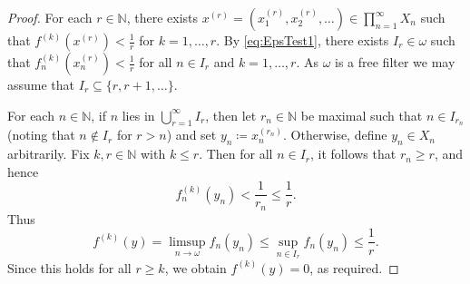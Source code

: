 \documentclass[a4paper,11pt]{amsart}
\theoremstyle{definition}
\numberwithin{equation}{section}
\numberwithin{theorem}{section}
\begin{document}
\begin{proof}
	For each $r \in \mathbb N$, there exists $x^{(r)}= (x_1^{(r)},x_2^{(r)},\dots) \in \prod_{n=1}^\infty X_n$ such that $f^{(k)}(x^{(r)}) < \frac1r$ for $k=1,\dots,r$. By \eqref{eq:EpsTest1}, there exists $I_r \in \omega$ such that $f_n^{(k)}(x_n^{(r)}) < \frac1r$ for all $n \in I_r$ and $k=1,\dots,r$. As $\omega$ is a free filter we may assume that $I_r\subseteq \{r,r+1,\dots\}$.
	
	For each $n\in\mathbb N$, if $n$ lies in $\bigcup_{r=1}^\infty I_r$, then let $r_n\in\mathbb N$ be maximal such that $n\in I_{r_n}$ (noting that $n\notin I_r$ for $r>n$) and set $y_n\coloneqq x_n^{(r_n)}$. Otherwise, define $y_n\in X_n$ arbitrarily.  Fix $k,r\in\mathbb N$ with $k\leq r$. Then for all $n\in I_r$, it follows that $r_n\geq r$, and hence
	\begin{equation} f^{(k)}_n(y_n) < \frac1{r_n}\leq\frac{1}{r}. \end{equation}
	Thus 
    \begin{equation}
        f^{(k)}(y) = \limsup_{n\to\omega} f_n(y_n) \leq \sup_{n \in I_r} f_n(y_n) \leq \frac1r.
    \end{equation}
	Since this holds for all $r\geq k$, we obtain $f^{(k)}(y)=0$, as required.
\end{proof} 
\end{document}
